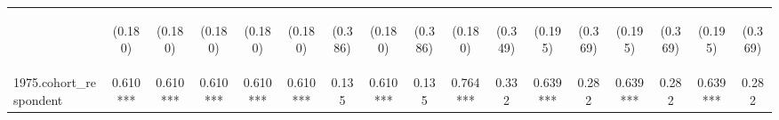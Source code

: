 \begin{center}
\begin{tabular}{lcccccccccccccccc}
\vspace{4pt} & \begin{footnotesize}(0.180)\end{footnotesize} & \begin{footnotesize}(0.180)\end{footnotesize} & \begin{footnotesize}(0.180)\end{footnotesize} & \begin{footnotesize}(0.180)\end{footnotesize} & \begin{footnotesize}(0.180)\end{footnotesize} & \begin{footnotesize}(0.386)\end{footnotesize} & \begin{footnotesize}(0.180)\end{footnotesize} & \begin{footnotesize}(0.386)\end{footnotesize} & \begin{footnotesize}(0.180)\end{footnotesize} & \begin{footnotesize}(0.349)\end{footnotesize} & \begin{footnotesize}(0.195)\end{footnotesize} & \begin{footnotesize}(0.369)\end{footnotesize} & \begin{footnotesize}(0.195)\end{footnotesize} & \begin{footnotesize}(0.369)\end{footnotesize} & \begin{footnotesize}(0.195)\end{footnotesize} & \begin{footnotesize}(0.369)\end{footnotesize} \\
1975.cohort\_respondent & 0.610*** & 0.610*** & 0.610*** & 0.610*** & 0.610*** & 0.135 & 0.610*** & 0.135 & 0.764*** & 0.332 & 0.639*** & 0.282 & 0.639*** & 0.282 & 0.639*** & 0.282 \\

\end{tabular}
\end{center}
